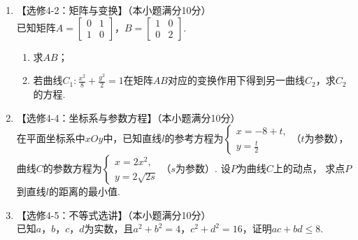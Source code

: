 \documentclass[12pt,space]{ctexart} %
\begin{document}
\begin{enumerate}[itemsep=-0.3em,topsep=0pt,resume]
\begin{enumerate}[itemsep=-0.3em,label={\Alph*.},topsep=0pt,labelsep=.5em,leftmargin=1.7em]
    \item 【选修4-2：矩阵与变换】（本小题满分10分）\\[0.4em] 
      已知矩阵$\displaystyle{A=\begin{bmatrix} 0 & 1 \\ 1 & 0 \end{bmatrix}}$，$\displaystyle{B=\begin{bmatrix} 1 & 0 \\ 0 & 2 \end{bmatrix}}$.
      \begin{enumerate}[itemsep=-0.3em,label={(\arabic*)},topsep=0pt,labelsep=.5em,leftmargin=1.7em]
        \item 求$AB$；
        \item 若曲线$\displaystyle{C_1: \frac{x^2}{8}+\frac{y^2}{2}=1}$在矩阵$AB$对应的变换作用下得到另一曲线$C_2$，求$C_2$的方程.
      \end{enumerate}
    \vspace{1ex}
    
    \item 【选修4-4：坐标系与参数方程】（本小题满分10分）\\
      在平面坐标系中$xOy$中，已知直线$l$的参考方程为$\displaystyle{\begin{cases}x=-8+t, \\ y = \displaystyle{\frac{t}{2}}\end{cases}}$（$t$为参数），
      曲线$C$的参数方程为$\displaystyle{\begin{cases}x=2x^2, \\ y = 2\sqrt{2s}\end{cases}}$（$s$为参数）. 设$P$为曲线$C$上的动点，
      求点$P$到直线$l$的距离的最小值.
    \vspace{1ex}
    
    \item 【选修4-5：不等式选讲】（本小题满分10分）\\
      已知$a$，$b$，$c$，$d$为实数，且$a^2+b^2=4$，$c^2+d^2=16$，证明$ac+bd\leq 8$.
  \end{enumerate}


\end{enumerate}
\end{document}
